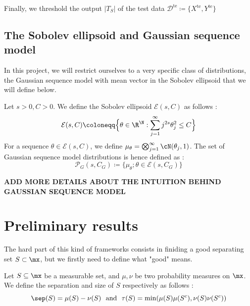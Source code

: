 Finally, we threshold the output $\left|T_S\right|$ of the test data $\mathcal{D}^\text{te} \coloneqq\bigl\{X^\text{te},Y^\text{te}\bigr\}$

\subsection{The Sobolev ellipsoid and Gaussian sequence model} 
In this project, we will restrict ourselves to a very specific class of distributions, the Gaussian sequence model with mean vector in the Sobolev ellipsoid that we will define below. 
\begin{definition}
    Let $s>0, C>0$. We define the Sobolev ellipsoid $\mathcal{E}(s,C)$ as follows : 
    \begin{equation*}
       \mathcal{E}(s,C) \coloneqq \Bigl\{\theta \in \R^\N : \sum _{j=1}^\infty j^{2s}\theta_j^2 \leq C\Bigr\} 
    \end{equation*}
    For a sequence $\theta \in \mathcal{E}(s,C)$, we define $\mu_\theta = \bigotimes_{j=1}^\infty \cN(\theta_j,1)$. The set of Gaussian sequence model distributions is hence defined as : 
    \begin{equation*}
        \mathcal{P}_G(s,C_G) \coloneqq \bigl\{\mu_\theta ; \theta \in \mathcal{E}(s,C_G)\bigr\}
    \end{equation*}
\end{definition}
\textbf{ADD MORE DETAILS ABOUT THE INTUITION BEHIND GAUSSIAN SEQUENCE MODEL}

\section{Preliminary results } 
The hard part of this kind of frameworks consists in finiding a good separating set $S \subset \mx$, but we firstly need to define what "good" means. 
\begin{definition}
    Let $S \subseteq \mx$ be a measurable set, and $\mu,\nu$ be two probability measures on $\mx$. We define the separation and size of $S$ respectively as follows : 
    \begin{equation*}
        \sep(S) = \mu(S)-\nu(S) \ \text{ and } \ \tau(S) = \min(\mu(S)\mu(S^c),\nu(S)\nu(S^c))
    \end{equation*}
\end{definition}


